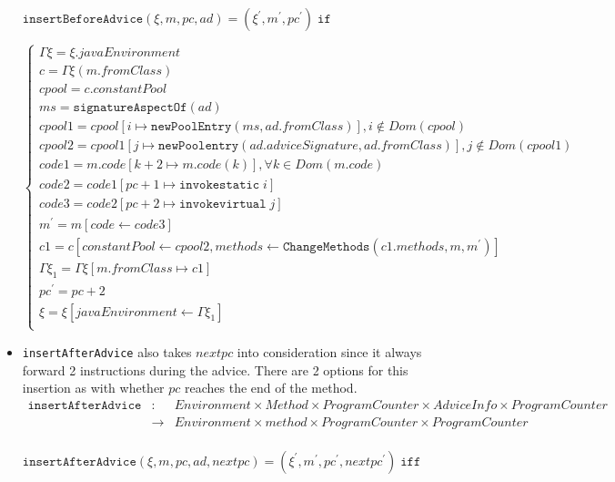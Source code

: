 \begin{itemize}
\quad\quad$\texttt{insertBeforeAdvice}(\xi,m,pc,ad)=(\xi^\prime,m^\prime,pc^\prime)\;\texttt{if}$

$\left\{
\begin{array}{l}
\Gamma\xi=\xi.javaEnvironment\\
c=\Gamma\xi(m.fromClass)\\
cpool=c.constantPool\\
ms=\texttt{signatureAspectOf}(ad)\\
cpool1=cpool[i\mapsto \texttt{newPoolEntry}(ms,ad.fromClass)],i\not\in Dom(cpool)\\
cpool2=cpool1[j\mapsto \texttt{newPoolentry}(ad.adviceSignature,ad.fromClass)],j\not\in Dom(cpool1)\\
code1 = m.code[k+2\mapsto m.code(k)],\forall k\in Dom(m.code)\\
code2=code1[pc+1\mapsto \texttt{invokestatic}\; i]\\
code3=code2[pc+2\mapsto \texttt{invokevirtual}\; j]\\
m^\prime=m[code\leftarrow code3]\\
c1= c[constantPool\leftarrow cpool2,methods\leftarrow \texttt{ChangeMethods}(c1.methods,m,m^\prime)]\\
\Gamma\xi_1=\Gamma\xi[m.fromClass\mapsto c1]\\
pc^\prime=pc+2\\
\xi=\xi[javaEnvironment\leftarrow\Gamma\xi_1]\\
\end{array}\right.$

\item
\texttt{insertAfterAdvice} also takes $nextpc$ into consideration since it always forward 2 instructions during the advice. There are 2 options for this insertion as with whether $pc$ reaches the end of the method.
\begin{eqnarray*}
  \texttt{insertAfterAdvice} &:\;\;& Environment\times Method\times ProgramCounter\times AdviceInfo\times ProgramCounter\\
  &\rightarrow& Environment\times method\times ProgramCounter\times ProgramCounter\\
\end{eqnarray*}

\quad\quad\quad$\texttt{insertAfterAdvice}(\xi,m,pc,ad,nextpc)=(\xi^\prime,m^\prime,pc^\prime,nextpc^\prime)\;\texttt{iff}$


\end{itemize}
